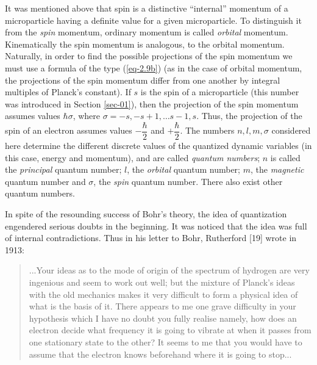 \documentclass[a4paper,sfsidenotes,colorlinks=true]{tufte-book}
\numberwithin{equation}{section}
\numberwithin{figure}{section}
\begin{document}
It was mentioned above that spin is a distinctive ``internal''
momentum of a microparticle having a definite value for a given
microparticle. To distinguish it from the \emph{spin} momentum,
ordinary momentum is called \emph{orbital} momentum. Kinematically the
spin momentum is analogous, to the orbital momentum. Naturally, in
order to find the possible projections of the spin momentum we must
use a formula of the type (\ref{eq-2.9b}) (as in the case of orbital
momentum, the projections of the spin momentum differ from one another
by integral multiples of Planck's constant). If $s$ is the spin of a
microparticle (this number was introduced in Section \ref{sec-01}),
then the projection of the spin momentum assumes values $\hbar
\sigma$, where $\sigma = -s,-s+1, \ldots s- 1, s $. Thus, the
projection of the spin of an electron assumes values $-
\dfrac{\hbar}{2}$ and $+ \dfrac{\hbar}{2}$. The numbers $n, l, m,
\sigma$ considered here determine the different discrete values of the
quantized dynamic variables (in this case, energy and momentum), and
are called \emph{quantum numbers}; $n$ is called the \emph{principal}
quantum number; $l$, the \emph{orbital} quantum number; $m$, the
\emph{magnetic} quantum number and $\sigma$, the \emph{spin} quantum
number. There also exist other quantum numbers.

In spite of the
resounding success of Bohr's theory, the idea of quantization
engendered serious doubts in the beginning. It was noticed that the
idea was full of internal contradictions. Thus in his letter to
Bohr, Rutherford [19] wrote in 1913: 
\begin{quote}
  ...Your ideas as to the mode of origin of the spectrum of hydrogen
  are very ingenious and seem to work out well; but the mixture of
  Planck's ideas with the old mechanics makes it very difficult to
  form a physical idea of what is the basis of it. There appears to me
  one grave difficulty in your hypothesis which I have no doubt you
  fully realise namely, how does an electron decide what frequency it
  is going to vibrate at when it passes from one stationary state to
  the other? It seems to me that you would have to assume that the
  electron knows beforehand where it is going to stop...
\end{quote}
\end{document}

